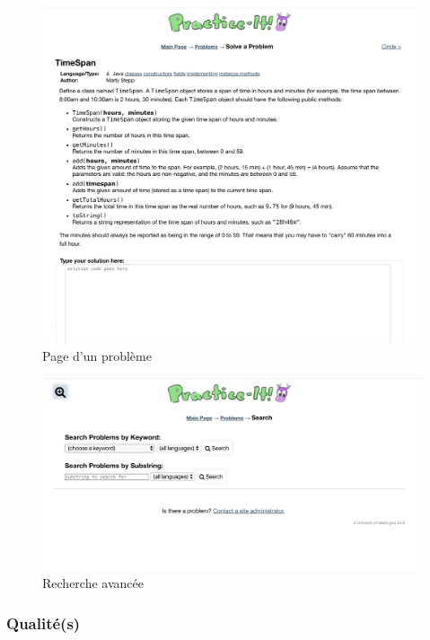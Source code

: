 \begin{figure}[H]
    \includegraphics[width=\textwidth,height=0.6\textheight,keepaspectratio]{images/comparison/practice-it-2.png}
    \centering
    \caption[Practice-it : page d'un problème]{Page d'un problème}
\end{figure}

\begin{figure}[H]
    \includegraphics[width=\textwidth,height=0.35\textheight,keepaspectratio]{images/comparison/practice-it-3.png}
    \centering
    \caption[Practice-it : recherche avancée]{Recherche avancée}
\end{figure}

\subsubsection*{Qualité(s)}

